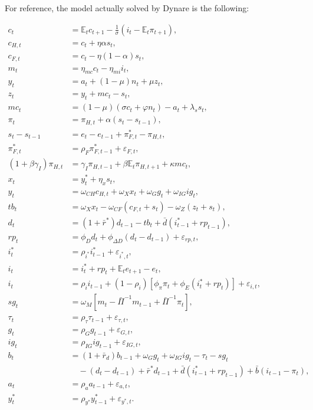 For reference, the model actually solved by Dynare is the following:

\begin{align}
c_t
&=
\mathbb E_tc_{t+1}
-\frac{1}{\sigma}
\left(
i_t-\mathbb E_t\pi_{t+1}
\right),
\tag{1}
\\
c_{H,t}
&=
c_t+\eta\alpha s_t,
\tag{2}
\\
c_{F,t}
&=
c_t-\eta(1-\alpha)s_t,
\tag{3}
\\
m_t
&=
\eta_{mc}c_t-\eta_{mi}i_t,
\tag{4}
\\
y_t
&=
a_t+(1-\mu)n_t+\mu z_t,
\tag{5}
\\
z_t
&=
y_t+mc_t-s_t,
\tag{6}
\\
mc_t
&=
(1-\mu)(\sigma c_t+\varphi n_t)-a_t+\lambda_ss_t,
\tag{7}
\\
\pi_t
&=
\pi_{H,t}+\alpha(s_t-s_{t-1}),
\tag{8}
\\
s_t-s_{t-1}
&=
e_t-e_{t-1}+\pi_{F,t}^{*}-\pi_{H,t},
\tag{9}
\\
\pi_{F,t}^{*}
&=
\rho_F\pi_{F,t-1}^{*}+\varepsilon_{F,t},
\tag{10}
\\
(1+\beta\gamma_I)\pi_{H,t}
&=
\gamma_I\pi_{H,t-1}
+\beta\mathbb E_t\pi_{H,t+1}
+\kappa mc_t,
\tag{11}
\\
x_t
&=
y_t^{*}+\eta_xs_t,
\tag{12}
\\
y_t
&=
\omega_{CH}c_{H,t}
+\omega_Xx_t
+\omega_Gg_t
+\omega_{IG}ig_t,
\tag{13}
\\
tb_t
&=
\omega_Xx_t
-\omega_{CF}(c_{F,t}+s_t)
-\omega_Z(z_t+s_t),
\tag{14}
\\
d_t
&=
(1+\bar r^{*})d_{t-1}
-tb_t
+\bar d(i_{t-1}^{*}+rp_{t-1}),
\tag{15}
\\
rp_t
&=
\phi_Dd_t+\phi_{\Delta D}(d_t-d_{t-1})
+\varepsilon_{rp,t},
\tag{16}
\\
i_t^{*}
&=
\rho_{i^{*}}i_{t-1}^{*}
+\varepsilon_{i^{*},t},
\tag{17}
\\
i_t
&=
i_t^{*}+rp_t+\mathbb E_te_{t+1}-e_t,
\tag{18}
\\
i_t
&=
\rho_i i_{t-1}
+
(1-\rho_i)
\left[
\phi_\pi\pi_t+\phi_E(i_t^{*}+rp_t)
\right]
+\varepsilon_{i,t},
\tag{19}
\\
sg_t
&=
\omega_M
\left[
m_t-\bar\Pi^{-1}m_{t-1}
+\bar\Pi^{-1}\pi_t
\right],
\tag{20}
\\
\tau_t
&=
\rho_\tau\tau_{t-1}
+\varepsilon_{\tau,t},
\tag{21}
\\
g_t
&=
\rho_Gg_{t-1}
+\varepsilon_{G,t},
\tag{22}
\\
ig_t
&=
\rho_{IG}ig_{t-1}
+\varepsilon_{IG,t},
\tag{23}
\\
b_t
&=
(1+\bar r_d)b_{t-1}
+\omega_Gg_t+\omega_{IG}ig_t-\tau_t-sg_t
\nonumber\\
&\quad
-(d_t-d_{t-1})
+\bar r^{*}d_{t-1}
+\bar d(i_{t-1}^{*}+rp_{t-1})
+\bar b(i_{t-1}-\pi_t),
\tag{24}
\\
a_t
&=
\rho_aa_{t-1}+\varepsilon_{a,t},
\tag{25}
\\
y_t^{*}
&=
\rho_{y^{*}}y_{t-1}^{*}+\varepsilon_{y^{*},t}.
\tag{26}
\end{align}

